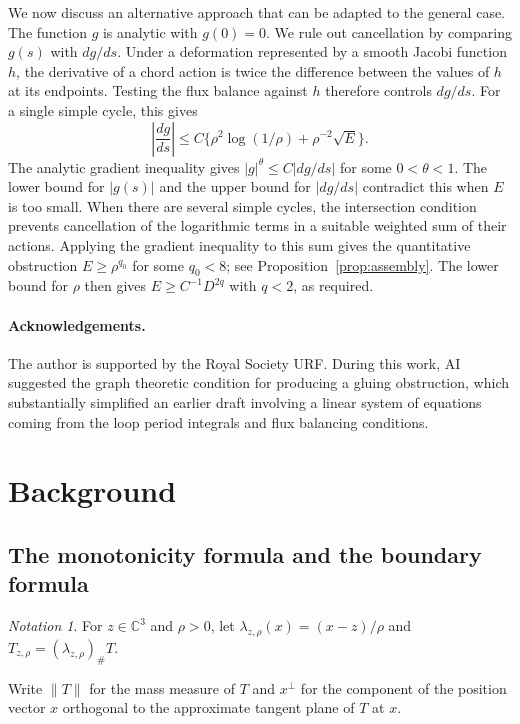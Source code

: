 \documentclass[11pt,a4paper]{article}
\numberwithin{equation}{section}
\theoremstyle{definition}
\theoremstyle{remark}
\newtheorem*{notation}{Notation}
\newcommand{\C}{\mathbb C}
\begin{document}
	We now discuss an alternative approach that can be adapted to the general
	case. The function $g$ is analytic with $g(0)=0$. We rule out cancellation
	by comparing $g(s)$ with $dg/ds$.
	Under a deformation represented
	by a smooth Jacobi function $h$, the derivative of a chord action is
	twice the difference between the values of $h$ at its endpoints. Testing the flux balance
	against $h$ therefore controls $dg/ds$.
	For a single simple cycle, this gives
	\[
	\left|\frac{dg}{ds}\right|
	\le C\{\rho^2\log(1/\rho)+\rho^{-2}\sqrt E\}.
	\]
	The analytic gradient inequality gives
	$|g|^\theta\le C|dg/ds|$ for some $0<\theta<1$. The lower bound for
	$|g(s)|$ and the upper bound for $|dg/ds|$ contradict this when $E$
	is too small. When there are several simple cycles,
	the intersection condition prevents cancellation of the logarithmic
	terms in a suitable weighted sum of their actions. Applying the
	gradient inequality to this sum gives the quantitative obstruction
	$E\ge\rho^{q_0}$ for some $q_0<8$; see Proposition~\ref{prop:assembly}.
	The lower bound for $\rho$ then gives
	$E\ge C^{-1}D^{2q}$ with $q<2$, as required.
	
	\paragraph{Acknowledgements.}
	The author is supported by the Royal Society URF.
	During this work, AI suggested the graph theoretic condition for producing
	a gluing obstruction, which substantially simplified an earlier draft involving a linear system
	of equations coming from the loop period integrals and flux balancing
	conditions.
	
	

	\section{Background}\label{sect:background}
	
	\subsection{The monotonicity formula and the boundary formula}
	
	\begin{notation}
		For $z\in\C^3$ and $\rho>0$, let
		$\lambda_{z,\rho}(x)=(x-z)/\rho$ and
		$T_{z,\rho}=(\lambda_{z,\rho})_\#T$.
	\end{notation}
	
	Write $\|T\|$ for the mass measure of $T$ and $x^\perp$ for the
	component of the position vector $x$ orthogonal to the approximate
	tangent plane of $T$ at $x$.
	
\end{document}
